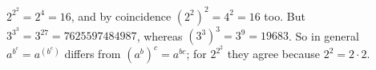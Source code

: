 $2^{2^2}=2^4=16$, and by coincidence $\left(2^2\right)^2=4^2=16$ too. But $3^{3^3}=3^{27}=7625597484987$, whereas $\left(3^3\right)^3=3^9=19683$. So in general $a^{b^c}=a^{(b^c)}$ differs from $\left(a^b\right)^c=a^{bc}$; for $2^{2^2}$ they agree because $2^2=2\cdot2$.

